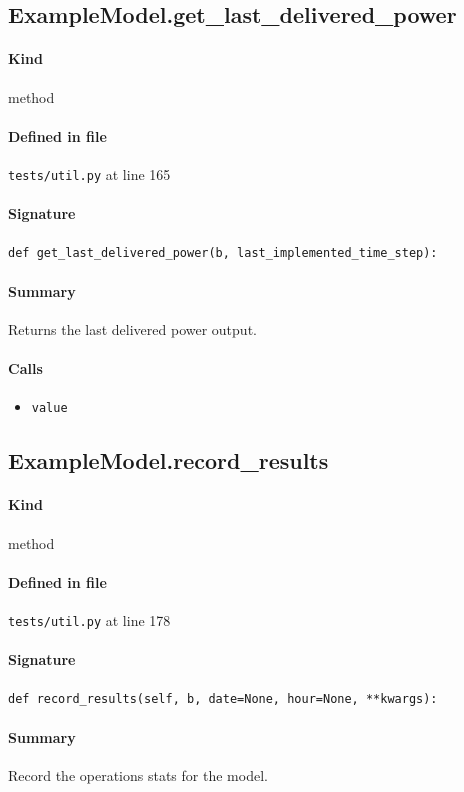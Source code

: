 \documentclass[11pt]{report}
\begin{document}
\subsection{ExampleModel.get\_last\_delivered\_power}
\label{def:tests-util.py:ExampleModel.get_last_delivered_power:L165}
\paragraph{Kind} method
\paragraph{Defined in file} \texttt{tests/util.py} at line 165
\paragraph{Signature} \texttt{def get\_last\_delivered\_power(b, last\_implemented\_time\_step):}
\paragraph{Summary} Returns the last delivered power output.
\paragraph{Calls}
\begin{itemize}[leftmargin=*]
  \item \texttt{value}
\end{itemize}
\subsection{ExampleModel.record\_results}
\label{def:tests-util.py:ExampleModel.record_results:L178}
\paragraph{Kind} method
\paragraph{Defined in file} \texttt{tests/util.py} at line 178
\paragraph{Signature} \texttt{def record\_results(self, b, date=None, hour=None, **kwargs):}
\paragraph{Summary} Record the operations stats for the model.
\end{document}
